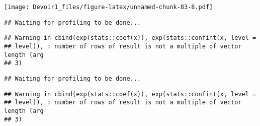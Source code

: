 \documentclass[]{article}
\newenvironment{Shaded}{\begin{snugshade}}{\end{snugshade}}
\newcommand{\KeywordTok}[1]{\textcolor[rgb]{0.13,0.29,0.53}{\textbf{#1}}}
\newcommand{\DataTypeTok}[1]{\textcolor[rgb]{0.13,0.29,0.53}{#1}}
\newcommand{\DecValTok}[1]{\textcolor[rgb]{0.00,0.00,0.81}{#1}}
\newcommand{\StringTok}[1]{\textcolor[rgb]{0.31,0.60,0.02}{#1}}
\newcommand{\OperatorTok}[1]{\textcolor[rgb]{0.81,0.36,0.00}{\textbf{#1}}}
\newcommand{\NormalTok}[1]{#1}
\begin{document}
\texttt{[image: Devoir1\_files/figure-latex/unnamed-chunk-83-8.pdf]}

\begin{Shaded}
\end{Shaded}

\begin{verbatim}
## Waiting for profiling to be done...
\end{verbatim}

\begin{verbatim}
## Warning in cbind(exp(stats::coef(x)), exp(stats::confint(x, level =
## level)), : number of rows of result is not a multiple of vector length (arg
## 3)
\end{verbatim}

\begin{verbatim}
## Waiting for profiling to be done...
\end{verbatim}

\begin{verbatim}
## Warning in cbind(exp(stats::coef(x)), exp(stats::confint(x, level =
## level)), : number of rows of result is not a multiple of vector length (arg
## 3)
\end{verbatim}
\end{document}
